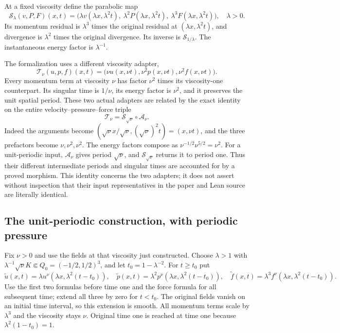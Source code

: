 \documentclass[10pt,a4paper]{article}
\begin{document}
At a fixed viscosity define the parabolic map
\[
 \mathscr S_\lambda(v,P,F)(x,t)=
   \big(\lambda v(\lambda x,\lambda^2t),\
        \lambda^2P(\lambda x,\lambda^2t),\
        \lambda^3F(\lambda x,\lambda^2t)\big),\quad\lambda>0.
 \tag{E.26}
\]
Its momentum residual is $\lambda^3$ times the original residual
at $(\lambda x,\lambda^2t)$, and divergence is $\lambda^2$ times
the original divergence. Its inverse is $\mathscr S_{1/\lambda}$.
The instantaneous energy factor is $\lambda^{-1}$.

The formalization uses a different viscosity adapter,
\[
 \mathscr T_\nu(u,p,f)(x,t)=
       \big(\nu u(x,\nu t),\nu^2p(x,\nu t),\nu^2f(x,\nu t)\big).
 \tag{E.27}
\]
Every momentum term at viscosity $\nu$ has factor $\nu^2$ times
its viscosity-one counterpart. Its singular time is $1/\nu$,
its energy factor is $\nu^2$, and it preserves the unit spatial
period. These two actual adapters are related by the exact identity
on the entire velocity--pressure--force triple
\[
                  \mathscr T_\nu
                       =\mathscr S_{\sqrt\nu}\circ\mathscr A_\nu.
 \tag{E.28}
\]
Indeed the arguments become
$(\sqrt\nu x/\sqrt\nu,(\sqrt\nu)^2t)=(x,\nu t)$,
and the three prefactors become $\nu,\nu^2,\nu^2$.
The energy factors compose as $\nu^{-1/2}\nu^{5/2}=\nu^2$.
For a unit-periodic input, $\mathscr A_\nu$ gives period $\sqrt\nu$,
and $\mathscr S_{\sqrt\nu}$ returns it to period one.
Thus their different intermediate periods and singular times are
accounted for by a proved morphism. This identity concerns the two
adapters; it does not assert without inspection that their input
representatives in the paper and Lean source are literally identical.

\subsection{The unit-periodic construction, with periodic pressure}

Fix $\nu>0$ and use the fields at that viscosity just constructed.
Choose $\lambda>1$ with
$\lambda^{-1}\sqrt\nu K\Subset Q_0=(-1/2,1/2)^3$, and let
$t_0=1-\lambda^{-2}$. For $t\ge t_0$ put
\[
 \widetilde u(x,t)=\lambda u^\nu(\lambda x,\lambda^2(t-t_0)),\quad
 \widetilde p(x,t)=\lambda^2p^\nu(\lambda x,\lambda^2(t-t_0)),\quad
 \widetilde f(x,t)=\lambda^3f^\nu(\lambda x,\lambda^2(t-t_0)).
 \tag{E.29}
\]
Use the first two formulas before time one and the force formula for
all subsequent time; extend all three by zero for $t<t_0$.
The original fields vanish on an initial time interval, so this
extension is smooth. All momentum terms scale by $\lambda^3$ and
the viscosity stays $\nu$. Original time one is reached at time one
because $\lambda^2(1-t_0)=1$.
\end{document}
